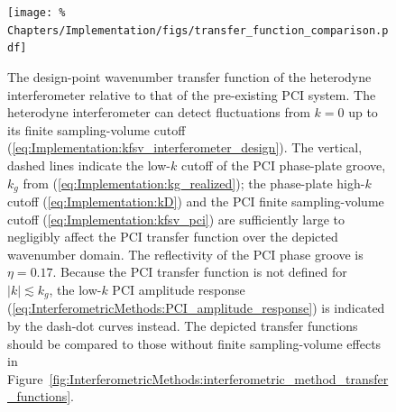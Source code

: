 \begin{figure}
  \centering
  \texttt{[image: \%
    Chapters/Implementation/figs/transfer\_function\_comparison.pdf]}
  \caption[Design-point wavenumber transfer functions of combined PCI-interferometer]{%
    The design-point wavenumber transfer function
    of the heterodyne interferometer relative to
    that of the pre-existing PCI system.
    The heterodyne interferometer can detect fluctuations from
    $k = 0$ up to its finite sampling-volume cutoff
    (\ref{eq:Implementation:kfsv_interferometer_design}).
    The vertical, dashed lines indicate
    the low-$k$ cutoff of the PCI phase-plate groove,
    $k_g$ from (\ref{eq:Implementation:kg_realized});
    the phase-plate high-$k$ cutoff (\ref{eq:Implementation:kD}) and
    the PCI finite sampling-volume cutoff (\ref{eq:Implementation:kfsv_pci})
    are sufficiently large to negligibly affect the PCI transfer function
    over the depicted wavenumber domain.
    The reflectivity of the PCI phase groove is $\eta = 0.17$.
    Because the PCI transfer function is not defined for $|k| \lesssim k_g$,
    the low-$k$ PCI amplitude response
    (\ref{eq:InterferometricMethods:PCI_amplitude_response})
    is indicated by the dash-dot curves instead.
    The depicted transfer functions should be compared
    to those without finite sampling-volume effects in
    Figure~\ref{fig:InterferometricMethods:interferometric_method_transfer_functions}.
  }
\label{fig:Implementation:transfer_function_comparison}
\end{figure}


